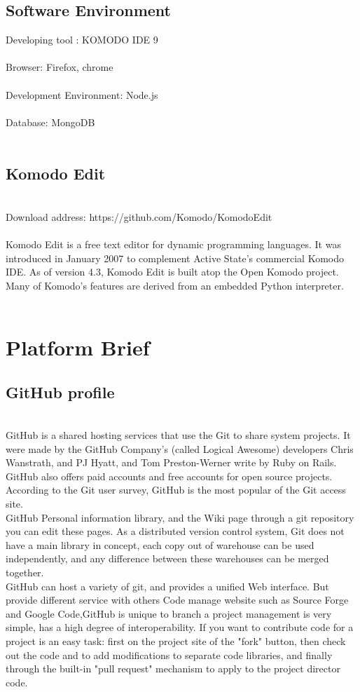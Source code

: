 \subsection{Software Environment}
Developing tool : KOMODO IDE 9 \\
\\
Browser: Firefox, chrome\\
\\
Development Environment: Node.js\\
\\
Database: MongoDB\\
\\
\subsection{Komodo Edit \cite{6}}
\\
Download address: https://github.com/Komodo/KomodoEdit\\ 
\\
Komodo Edit is a free text editor for dynamic programming languages. It was introduced in January 2007 to complement Active State's commercial Komodo IDE. As of version 4.3, Komodo Edit is built atop the Open Komodo project. Many of Komodo's features are derived from an embedded Python interpreter.\\
\\
\section{Platform Brief }
\subsection{GitHub profile \cite{8}}
\\
GitHub is a shared hosting services that use the Git to share system projects. It were made by the GitHub Company’s (called Logical Awesome) developers Chris Wanstrath, and PJ Hyatt, and Tom Preston-Werner write by Ruby on Rails. GitHub also offers paid accounts and free accounts for open source projects. According to the Git user survey, GitHub is the most popular of the Git access site. \\
GitHub Personal information library, and the Wiki page through a git repository you can edit these pages. As a distributed version control system, Git does not have a main library in concept, each copy out of warehouse can be used independently, and any difference between these warehouses can be merged together.\\ 
GitHub can host a variety of git, and provides a unified Web interface. But provide different service with others Code manage website such as Source Forge and Google Code,GitHub is unique to branch a project management is very simple, has a high degree of interoperability. If you want to contribute code for a project is an easy task: first on the project site of the "fork" button, then check out the code and to add modifications to separate code libraries, and finally through the built-in "pull request" mechanism to apply to the project director code.\\ 
\\